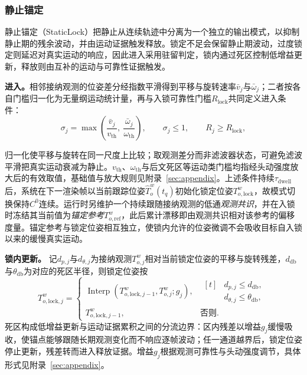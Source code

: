 \documentclass[review]{vgtc}
\begin{document}
\subsubsection{静止锚定}\label{sec:staticlock}

静止锚定（StaticLock）把静止从连续轨迹中分离为一个独立的输出模式，以抑制静止期的残余波动，并由运动证据触发释放。锁定不足会保留静止期波动，过度锁定则延迟对真实运动的响应，因此进入采用驻留判定，锁内通过死区控制低增益更新，释放则由互补的运动与可靠性证据触发。

\textbf{进入。}相邻接纳观测的位姿差分经指数平滑得到平移与旋转速率$\bar{v}_j$与$\bar{\omega}_j$；二者按各自门槛归一化为无量纲运动统计量，再与入锁可靠性门槛$R_{\mathrm{lock}}$共同定义进入条件：
\begin{equation}
\sigma_j = \max\left(\frac{\bar{v}_j}{v_{\mathrm{th}}},\ \frac{\bar{\omega}_j}{\omega_{\mathrm{th}}}\right), \qquad \sigma_j \leq 1, \qquad R_j \geq R_{\mathrm{lock}},
\label{eq:lock-entry}
\end{equation}

归一化使平移与旋转在同一尺度上比较；取观测差分而非滤波器状态，可避免滤波平滑把真实运动衰减为静止。$v_{\mathrm{th}}$、$\omega_{\mathrm{th}}$与后文死区等运动类门槛均指经头动强度放大后的有效取值，基础值与放大规则见附录~\ref{sec:appendix}。上述条件持续$\tau_{\mathrm{dwell}}$后，系统在下一渲染帧以当前跟踪位姿$\widehat{T}_o^w(t_q)$初始化锁定位姿$T_{o,\mathrm{lock}}^w$，故模式切换保持$C^0$连续。运行时另维护一个持续跟随接纳观测的低通\emph{观测共识}，并在入锁时冻结其当前值为\emph{锚定参考}$T_{o,\mathrm{ref}}^w$，此后累计漂移即由观测共识相对该参考的偏移度量。锚定参考与锁定位姿相互独立，使锁内允许的位姿微调不会吸收目标自入锁以来的缓慢真实运动。

\textbf{锁内更新。}
记$d_{p,j}$与$d_{\theta,j}$为接纳观测$T_{o,j}^{w}$相对当前锁定位姿的平移与旋转残差，$d_{\mathrm{db}}$与$\theta_{\mathrm{db}}$为对应的死区半径，则锁定位姿按
\begin{equation}
T_{o,\mathrm{lock},j}^w =
\begin{cases}
\operatorname{Interp}
\left(
T_{o,\mathrm{lock},j-1}^w,
T_{o,j}^{w};
g_j
\right),
&
\begin{aligned}[t]
&d_{p,j} \leq d_{\mathrm{db}},\\
&d_{\theta,j} \leq \theta_{\mathrm{db}},
\end{aligned}
\\[2pt]
T_{o,\mathrm{lock},j-1}^w,
&
\text{否则}.
\end{cases}
\label{eq:lock-update}
\end{equation}
死区构成低增益更新与运动证据累积之间的分流边界：区内残差以增益$g_j$缓慢吸收，使锚点能够跟随长期观测变化而不响应逐帧波动；任一通道越界后，锁定位姿停止更新，残差转而进入释放证据。增益$g_j$根据观测可靠性与头动强度调节，具体形式见附录~\ref{sec:appendix}。
\end{document}
